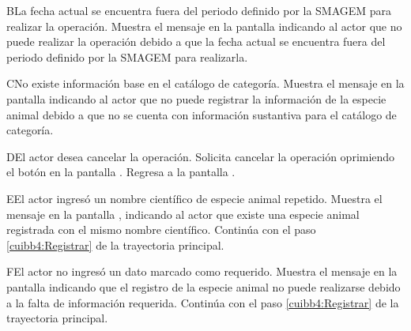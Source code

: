   \begin{UCtrayectoriaA}{B}{La fecha actual se encuentra fuera del periodo definido por la SMAGEM para realizar la operación.}
    \UCpaso[\UCsist] Muestra el mensaje  en la pantalla  indicando al actor que no puede realizar la operación debido a que la fecha actual se encuentra fuera del periodo definido por la SMAGEM para realizarla. 
 \end{UCtrayectoriaA}
 
 \begin{UCtrayectoriaA}{C}{No existe información base en el catálogo de categoría.}
    \UCpaso[\UCsist] Muestra el mensaje  en la pantalla  indicando al actor que no puede registrar la información de la especie animal debido a que no se cuenta con información sustantiva para el catálogo de categoría.
 \end{UCtrayectoriaA}
 
    \begin{UCtrayectoriaA}{D}{El actor desea cancelar la operación.}
    \UCpaso[\UCactor] Solicita cancelar la operación oprimiendo el botón  en la pantalla .
    \UCpaso[] Regresa a la pantalla . 
    \end{UCtrayectoriaA}
  
   \begin{UCtrayectoriaA}{E}{El actor ingresó un nombre científico de especie animal repetido.}
    \UCpaso[\UCsist] Muestra el mensaje  en la pantalla , indicando al actor que existe una especie animal registrada con el mismo nombre científico.
    \UCpaso[] Continúa con el paso \ref{cuibb4:Registrar} de la trayectoria principal.
 \end{UCtrayectoriaA}
 
    \begin{UCtrayectoriaA}{F}{El actor no ingresó un dato marcado como requerido.}    
    \UCpaso[\UCsist] Muestra el mensaje  en la pantalla  indicando que el registro de la especie animal no puede realizarse debido a la falta de información requerida.
    \UCpaso[] Continúa con el paso \ref{cuibb4:Registrar} de la trayectoria principal.     
    \end{UCtrayectoriaA}
 
